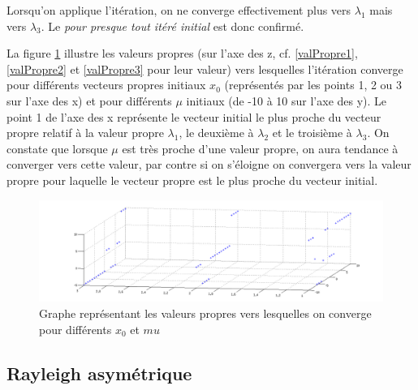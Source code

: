 Lorsqu'on applique l'itération, on ne converge effectivement plus vers $\lambda_1$ mais vers $\lambda_3$. Le \textit{pour presque tout itéré initial} est donc confirmé.


La figure \ref{fig:RaySym} illustre les valeurs propres (sur l'axe des z, cf. \ref{valPropre1}, \ref{valPropre2} et \ref{valPropre3} pour leur valeur) vers lesquelles l'itération converge pour différents vecteurs propres initiaux $x_0$ (représentés par les points 1, 2 ou 3 sur l'axe des x) et pour différents $\mu$ initiaux (de -10 à 10 sur l'axe des y). Le point 1 de l'axe des x représente le vecteur initial le plus proche du vecteur propre relatif à la valeur propre $\lambda_1$, le deuxième à $\lambda_2$ et le troisième à $\lambda_3$. On constate que lorsque $\mu$ est très proche d'une valeur propre, on aura tendance à converger vers cette valeur, par contre si on s'éloigne on convergera vers la valeur propre pour laquelle le vecteur propre est le plus proche du vecteur initial. 

\begin{figure}
  \centering
  \includegraphics[width=15cm]{RaySym.png}
  \caption{Graphe représentant les valeurs propres vers lesquelles on converge pour différents $x_0$ et $mu$}
  \label{fig:RaySym}
\end{figure}
\subsection*{Rayleigh asymétrique}

